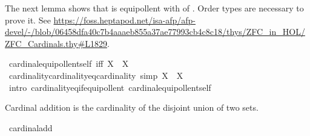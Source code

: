 \begin{isabellebody}
\endisatagproof
{\isafoldproof}%
%
\isadelimproof
%
\endisadelimproof
%
\begin{isamarkuptext}%
The next lemma shows that  is equipollent with  of .
Order types are necessary to prove it. See
\url{https://foss.heptapod.net/isa-afp/afp-devel/-/blob/06458dfa40c7b4aaaeb855a37ae77993cb4c8c18/thys/ZFC_in_HOL/ZFC_Cardinals.thy\#L1829}.%
\end{isamarkuptext}\isamarkuptrue%
\isamarkupfalse%
\ cardinal{\isacharunderscore}{\kern0pt}equipollent{\isacharunderscore}{\kern0pt}self\ {\isacharbrackleft}{\kern0pt}iff{\isacharbrackright}{\kern0pt}{\isacharcolon}{\kern0pt}\ {\isachardoublequoteopen}{\isacharbar}{\kern0pt}X{\isacharbar}{\kern0pt}\ {\isasymapprox}\ X{\isachardoublequoteclose}\isanewline
%
\isadelimproof
\ \ %
\endisadelimproof
%
\isatagproof
{}\isamarkupfalse%
%
\endisatagproof
{\isafoldproof}%
%
\isadelimproof
\isanewline
%
\endisadelimproof
\isanewline
{}\isamarkupfalse%
\ cardinality{\isacharunderscore}{\kern0pt}cardinality{\isacharunderscore}{\kern0pt}eq{\isacharunderscore}{\kern0pt}cardinality\ {\isacharbrackleft}{\kern0pt}simp{\isacharbrackright}{\kern0pt}{\isacharcolon}{\kern0pt}\ {\isachardoublequoteopen}{\isacharbar}{\kern0pt}{\isacharbar}{\kern0pt}X{\isacharbar}{\kern0pt}{\isacharbar}{\kern0pt}\ {\isacharequal}{\kern0pt}\ {\isacharbar}{\kern0pt}X{\isacharbar}{\kern0pt}{\isachardoublequoteclose}\isanewline
%
\isadelimproof
\ \ %
\endisadelimproof
%
\isatagproof
{}\isamarkupfalse%
\ {\isacharparenleft}{\kern0pt}intro\ cardinality{\isacharunderscore}{\kern0pt}eq{\isacharunderscore}{\kern0pt}if{\isacharunderscore}{\kern0pt}equipollent\ cardinal{\isacharunderscore}{\kern0pt}equipollent{\isacharunderscore}{\kern0pt}self{\isacharparenright}{\kern0pt}%
\endisatagproof
{\isafoldproof}%
%
\isadelimproof
%
\endisadelimproof
%
\isadelimdocument
%
\endisadelimdocument
%
\isatagdocument
%
\isamarkuptrue%
%
\endisatagdocument
{\isafolddocument}%
%
\isadelimdocument
%
\endisadelimdocument
%
\begin{isamarkuptext}%
Cardinal addition is the cardinality of the disjoint union of two sets.%
\end{isamarkuptext}\isamarkuptrue%
\isamarkupfalse%
\ {\isachardoublequoteopen}cardinal{\isacharunderscore}{\kern0pt}add\ {\isasymkappa}\ {\isasymmu}\ {\isasymequiv}\ {\isacharbar}{\kern0pt}{\isasymkappa}\ {\isasymCoprod}\ {\isasymmu}{\isacharbar}{\kern0pt}{\isachardoublequoteclose}\isanewline

\end{isabellebody}
